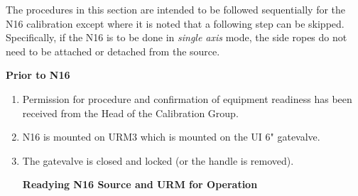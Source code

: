 \documentclass[10pt]{article}
\begin{document}
The procedures in this section are intended to be followed sequentially for the N16 calibration except where it is noted that a following step can be skipped. Specifically, if the N16 is to be done in {\it single axis} mode, the side ropes do not need to be attached or detached from the source.

{\bf Prior to N16}

\begin{enumerate}
\item \CheckBox[name=n16p1]{} Permission for procedure and confirmation of equipment readiness has been received from the Head of the Calibration Group.
\item \CheckBox[name=n16p2]{} N16 is mounted on URM3 which is mounted on the UI 6" gatevalve.
\item \CheckBox[name=n16p3]{} The gatevalve is closed and locked (or the handle is removed).

{\bf Readying N16 Source and URM for Operation}


\end{enumerate}
\end{document}
